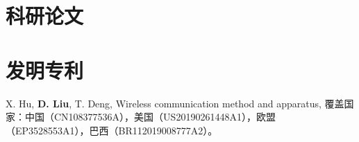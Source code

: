 \documentclass[a4paper,10pt]{article}
\begin{document}
\section{科研论文}

\begin{bibunit}
  \renewcommand\refname{会议}
  \nocite{
    zuxing2020cdc,
    anubhad2020,
    andrea2020,
    liu2020powering,
    honore2020hidden,
    liu2020neural,
    liu2019entropy,
    liu2019alpha,
    liu2019dominant,
    zhang2015effective,
  liu2015node,
  wang2015structural,
  liuenergy,
  ren2015applying,
  ren2015spectram,
  ren2015spectrum1}
  \footnotesize{\putbib[../bibfile]}
\end{bibunit}
\begin{bibunit}
  \renewcommand\refname{期刊}
  \nocite{
    liu2019discontinuous,
    liu2018will,
    liu2015bounds,
    liu2014secondary,
    wang2015rsh}
  \footnotesize{\putbib[../bibfile]}
\end{bibunit}

\begin{bibunit}
  \renewcommand\refname{Preprint}
  \nocite{
    ghosh2020rebust,
    liu2020region,
    liu2020alpha,
    jing2020unfair,
    chatterjee2019ssfn}
  \footnotesize{\putbib[../bibfile]}
\end{bibunit}

\section{发明专利}
 X. Hu, \textbf{D. Liu}, T. Deng, Wireless communication method and apparatus, 覆盖国家：中国（CN108377536A），美国（US20190261448A1），欧盟（EP3528553A1），巴西（BR112019008777A2）。
\end{document}
